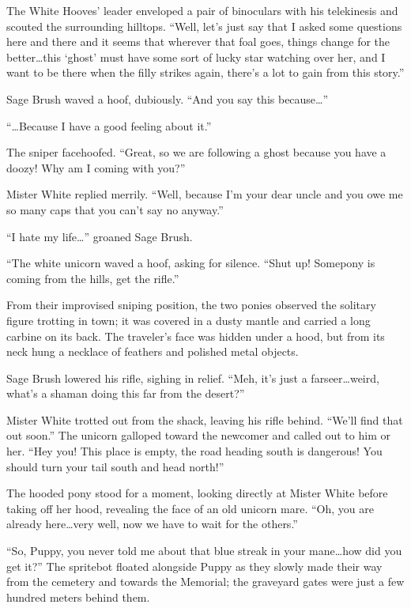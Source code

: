 The White Hooves' leader enveloped a pair of binoculars with his telekinesis and scouted the surrounding hilltops. ``Well, let's just say that I asked some questions here and there and it seems that wherever that foal goes, things change for the better\dots this `ghost' must have some sort of lucky star watching over her, and I want to be there when the filly strikes again, there's a lot to gain from this story.''

Sage Brush waved a hoof, dubiously. ``And you say this because\dots''

``\dots Because I have a good feeling about it.''

The sniper facehoofed. ``Great, so we are following a ghost because you have a doozy! Why am I coming with you?''

Mister White replied merrily. ``Well, because I'm your dear uncle and you owe me so many caps that you can't say no anyway.''

``I hate my life\dots'' groaned Sage Brush.

``The white unicorn waved a hoof, asking for silence. ``Shut up! Somepony is coming from the hills, get the rifle.''

From their improvised sniping position, the two ponies observed the solitary figure trotting in town; it was covered in a dusty mantle and carried a long carbine on its back. The traveler's face was hidden under a hood, but from its neck hung a necklace of feathers and polished metal objects.

Sage Brush lowered his rifle, sighing in relief. ``Meh, it's just a farseer\dots weird, what's a shaman doing this far from the desert?''

Mister White trotted out from the shack, leaving his rifle behind. ``We'll find that out soon.'' The unicorn galloped toward the newcomer and called out to him or her. ``Hey you! This place is empty, the road heading south is dangerous! You should turn your tail south and head north!''

The hooded pony stood for a moment, looking directly at Mister White before taking off her hood, revealing the face of an old unicorn mare. ``Oh, you are already here\dots very well, now we have to wait for the others.''

\horizonline


``So, Puppy, you never told me about that blue streak in your mane\dots how did you get it?'' The spritebot floated alongside Puppy as they slowly made their way from the cemetery and towards the Memorial; the graveyard gates were just a few hundred meters behind them.

